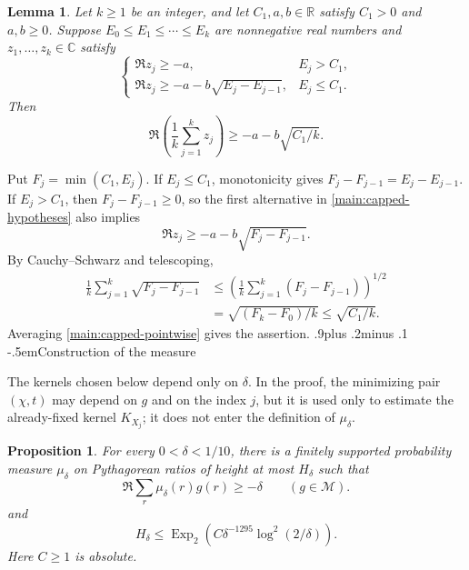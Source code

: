 \documentclass[twoside]{aomart}
\makeatletter
\theoremstyle{paperplain}
\newtheorem{proposition}[theorem]{Proposition}
\newtheorem{lemma}[theorem]{Lemma}
\theoremstyle{paperdefinition}
\renewcommand\subsection{\@startsection{subsection}{2}{\z@}
  {.9\baselineskip plus .2\baselineskip minus .1\baselineskip}
  {-.5em}{\normalfont\bfseries}}
\renewenvironment{proof}[1][\proofname]{\par\pushQED{\qed}%
  \normalfont\topsep6\p@\@plus3\p@\relax\trivlist
  \item[\hskip\labelsep\itshape #1\@addpunct{.}]\ignorespaces
}{\popQED\endtrivlist\@endpefalse}
\numberwithin{equation}{section}
\makeatother
\begin{document}
\begin{lemma}\label{main:capped-average}
Let $k\ge1$ be an integer, and let $C_1,a,b\in\mathbb R$ satisfy
$C_1>0$ and $a,b\ge0$. Suppose
$E_0\le E_1\le\cdots\le E_k$ are nonnegative real numbers and
$z_1,\ldots,z_k\in\mathbb C$ satisfy
\begin{equation}
 \begin{cases}
 \Re z_j\ge-a,&E_j>C_1,\\
 \Re z_j\ge-a-b\sqrt{E_j-E_{j-1}},&E_j\le C_1.
 \end{cases}
 \label{main:capped-hypotheses}
\end{equation}
Then
\begin{equation*}
 \Re\left(\frac1k\sum_{j=1}^kz_j\right)
 \ge-a-b\sqrt{C_1/k}.
\end{equation*}
\end{lemma}

\begin{proof}
Put $F_j=\min(C_1,E_j)$. If $E_j\le C_1$, monotonicity gives
$F_j-F_{j-1}=E_j-E_{j-1}$. If $E_j>C_1$, then
$F_j-F_{j-1}\ge0$, so the first alternative in
\eqref{main:capped-hypotheses} also implies
\begin{equation}
 \Re z_j\ge-a-b\sqrt{F_j-F_{j-1}}.
 \label{main:capped-pointwise}
\end{equation}
By Cauchy--Schwarz and telescoping,
\begin{align*}
 \frac1k\sum_{j=1}^k\sqrt{F_j-F_{j-1}}
 &\le\left(\frac1k\sum_{j=1}^k(F_j-F_{j-1})\right)^{1/2}\\
 &=\sqrt{(F_k-F_0)/k}\le\sqrt{C_1/k}.
\end{align*}
Averaging \eqref{main:capped-pointwise} gives the assertion.
\end{proof}
\subsection{Construction of the measure}

The kernels chosen below depend only on $\delta$.  In the proof, the
minimizing pair $(\chi,t)$ may depend on $g$ and on the index $j$, but it
is used only to estimate the already-fixed kernel $K_{X_j}$; it does not
enter the definition of $\mu_\delta$.

\begin{proposition}\label{main:finite-measure}
For every $0<\delta<1/10$, there is a finitely supported probability
measure $\mu_\delta$ on Pythagorean ratios of height at most $H_\delta$
such that
\begin{equation}
 \Re\sum_r\mu_\delta(r)g(r)\ge-\delta
                  \qquad(g\in\mathcal M).
 \label{main:universal-lower-bound}
\end{equation}
and
\begin{equation*}
 H_\delta\le\operatorname{Exp}_2
          \left(C\delta^{-1295}\log^2(2/\delta)\right).
\end{equation*}
Here $C\ge1$ is absolute.
\end{proposition}
\end{document}
